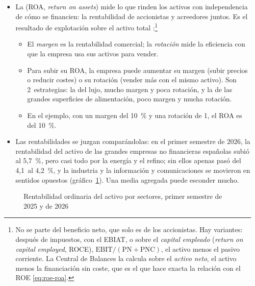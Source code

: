 \documentclass[11pt]{article}
\begin{document}
\begin{itemize}
\item La  (ROA, \emph{return on assets}) mide lo que rinden los activos con independencia de cómo se financien: la rentabilidad de accionistas y acreedores juntos. Es el resultado de explotación sobre el activo total :\footnote{No se parte del beneficio neto, que solo es de los accionistas. Hay variantes: después de impuestos, con el EBIAT, o sobre el \emph{capital empleado} (\emph{return on capital employed}, ROCE), $\mathrm{EBIT}/(\mathrm{PN}+\mathrm{PNC})$, el activo menos el pasivo corriente. La Central de Balances la calcula sobre el \emph{activo neto}, el activo menos la financiación sin coste, que es el que hace exacta la relación con el ROE \eqref{eq:roe-roa}.}
  \begin{itemize}
  \item El \emph{margen} es la rentabilidad comercial; la \emph{rotación} mide la eficiencia con que la empresa usa sus activos para vender.
  \item Para subir su ROA, la empresa puede aumentar su margen (subir precios o reducir costes) o su rotación (vender más con el mismo activo). Son 2~estrategias: la del lujo, mucho margen y poca rotación, y la de las grandes superficies de alimentación, poco margen y mucha rotación.
  \item En el ejemplo, con un margen del 10~\% y una rotación de 1, el ROA es del 10~\%.
  \end{itemize}
\item Las rentabilidades se juzgan comparándolas: en el primer semestre de 2026, la rentabilidad del activo de las grandes empresas no financieras españolas subió al 5,7~\%, pero casi todo por la energía y el refino; sin ellos apenas pasó del 4,1~al 4,2~\%, y la industria y la información y comunicaciones se movieron en sentidos opuestos (gráfico~\ref{fig:roa-sectores})\nocite{BdE2026CBT2T}. Una media agregada puede esconder mucho.
\end{itemize}

\begin{figure}[H]
\centering
\caption{Rentabilidad ordinaria del activo por sectores, primer semestre de 2025 y de 2026}\label{fig:roa-sectores}
\end{figure}
\end{document}
